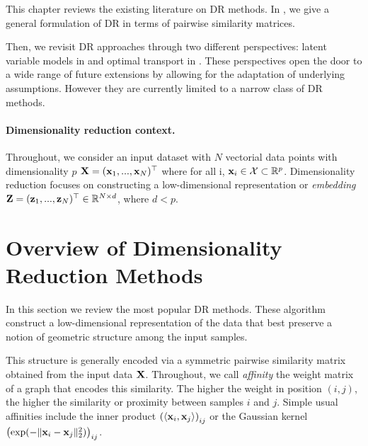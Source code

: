 \newpage

This chapter reviews the existing literature on DR methods. In , we give a general formulation of DR in terms of pairwise similarity matrices. 

Then, we revisit DR approaches through two different perspectives:
latent variable models in  and optimal transport in . These perspectives open the door to a wide range of future extensions by allowing for the adaptation of underlying assumptions. However they are currently limited to a narrow class of DR methods.


\paragraph{Dimensionality reduction context.}
Throughout, we consider an input dataset with $N$ vectorial data points with dimensionality $p$ \ie ${\mathbf{X}} = ({\mathbf{x}}_1, ..., {\mathbf{x}}_N) ^\top$ where for all i, ${\mathbf{x}}_i \in \mathcal{X} \subset \mathbb{R}^{p}$. Dimensionality reduction focuses on constructing a low-dimensional representation or \emph{embedding} ${\mathbf{Z}} = ({\mathbf{z}}_1, ..., {\mathbf{z}}_N)^\top \in \mathbb{R}^{N \times d}$, where $d< p$.

\section{Overview of Dimensionality Reduction Methods}\label{sec:background_dr}

In this section we review the most popular DR methods. These algorithm construct a low-dimensional representation of the data that best preserve a notion of geometric structure among the input samples. 

This structure is generally encoded via a symmetric pairwise similarity matrix obtained from the input data ${\mathbf{X}}$. Throughout, we call \emph{affinity} the weight matrix of a graph that encodes this similarity. The higher the weight in position $(i,j)$, the
higher the similarity or proximity between samples $i$ and $j$. Simple usual affinities include the inner product $\left( \langle {\mathbf{x}}_i, {\mathbf{x}}_j \rangle \right)_{ij}$ or the Gaussian kernel $\left( \exp(-\|{\mathbf{x}}_i - {\mathbf{x}}_j\|_2^2) \right)_{ij}$.




